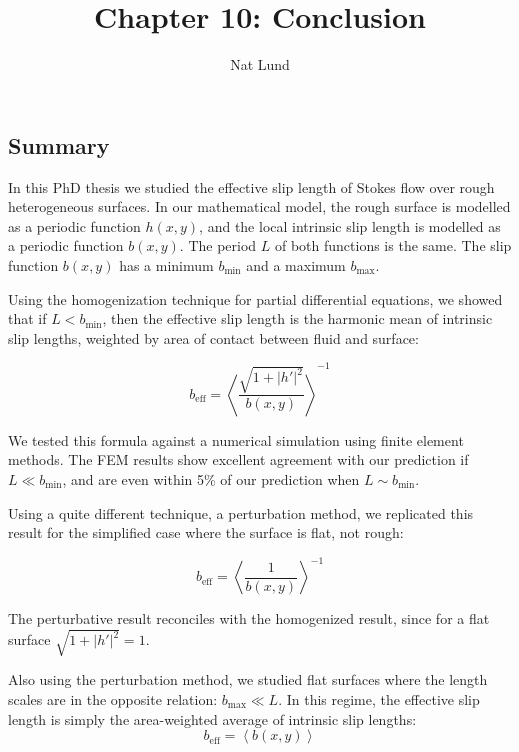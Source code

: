 \documentclass[a4paper]{report}
\title{Chapter 10: Conclusion}
\author{Nat Lund}
\newcommand{\beff}{\ensuremath{b_{\mathrm{eff}}}}
\newcommand{\bmin}{\ensuremath{b_{\mathrm{min}}}}
\newcommand{\bmax}{\ensuremath{b_{\mathrm{max}}}}
\begin{document}
\maketitle

\subsection*{Summary}

In this PhD thesis we studied the effective slip length of Stokes flow over rough heterogeneous surfaces.  In our mathematical model, the rough surface is modelled as a periodic function $h(x,y)$, and the local intrinsic slip length is modelled as a periodic function $b(x,y)$.  The period $L$ of both functions is the same.  The slip function $b(x,y)$ has a minimum $\bmin$ and a maximum $\bmax$.

Using the homogenization technique for partial differential equations, we showed that if $L < \bmin$, then the effective slip length is the harmonic mean of intrinsic slip lengths, weighted by area of contact between fluid and surface:

\begin{equation}
\beff = \left< \frac{\sqrt{1+ |h'|^2}}{b(x,y)} \right>^{-1}
\end{equation}

We tested this formula against a numerical simulation using finite element methods.  The FEM results show excellent agreement with our prediction if $L \ll \bmin$, and are even within 5\% of our prediction when $L \sim \bmin$.

\vspace*{1em}
Using a quite different technique, a perturbation method, we replicated this result for the simplified case where the surface is flat, not rough:

\begin{equation}
\beff = \left< \frac{1}{b(x,y)} \right>^{-1}
\end{equation}

The perturbative result reconciles with the homogenized result, since for a flat surface $\sqrt{1+ |h'|^2} = 1$.

Also using the perturbation method, we studied flat surfaces where the length scales are in the opposite relation: $\bmax \ll L$.  In this regime, the effective slip length is simply the area-weighted average of intrinsic slip lengths:
\begin{equation}
\beff = \left< b(x,y) \right>
\end{equation}
\end{document}
